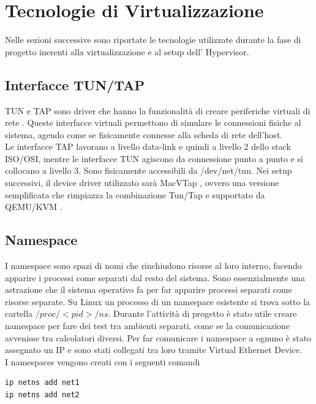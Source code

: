 \section*{Tecnologie di Virtualizzazione}
Nelle sezioni successive sono riportate le tecnologie utilizzate durante la fase di progetto inerenti alla virtualizzazione e al setup dell' Hypervisor.


\subsection*{Interfacce TUN/TAP}
TUN e TAP sono driver che hanno la funzionalità di creare periferiche virtuali di rete \cite{noauthor_universal_nodate}. Queste interfacce virtuali permettono di simulare le connessioni fisiche al sistema, agendo come se fisicamente connesse alla scheda di rete dell'host.\\
Le interfacce TAP lavorano a livello data-link e quindi a livello 2 dello stack ISO/OSI, mentre le interfacce TUN agiscono da connessione punto a punto e si collocano a livello 3. 
Sono fisicamente accessibili da /dev/net/tun.
Nei setup successivi, il device driver utilizzato sarà MacVTap \cite{noauthor_using_nodate}, ovvero una versione semplificata che rimpiazza la combinazione Tun/Tap e supportato da QEMU/KVM \cite{noauthor_qemu_nodate} \cite{principles}.

\subsection*{Namespace}
I namespace sono spazi di nomi che rinchiudono risorse al loro interno, facendo apparire i processi come separati dal resto del sistema. Sono essenzialmente una astrazione che il sistema operativo fa per far apparire processi separati come risorse separate. Su Linux un processo di un namespace esistente si trova sotto la cartella \textbf{$/proc/<pid>/ns$}.
Durante l'attività di progetto è stato utile creare namespace per fare dei test tra ambienti separati, come se la comunicazione avvenisse tra calcolatori diversi. Per far comunicare i namespace a ognuno è stato assegnato un IP e sono stati collegati tra loro tramite Virtual Ethernet Device.\\
I namespaces vengono creati con i seguenti comandi
\begin{verbatim}
ip netns add net1
ip netns add net2
\end{verbatim}
